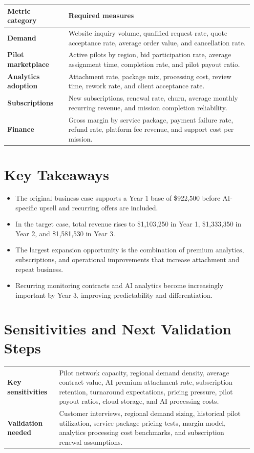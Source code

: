 \documentclass[11pt,a4paper]{article}
\begin{document}
\begin{longtable}{>{\bfseries}p{}p{}}
\toprule
Metric category & Required measures \\
\midrule
Demand & Website inquiry volume, qualified request rate, quote acceptance rate, average order value, and cancellation rate. \\
Pilot marketplace & Active pilots by region, bid participation rate, average assignment time, completion rate, and pilot payout ratio. \\
Analytics adoption & Attachment rate, package mix, processing cost, review time, rework rate, and client acceptance rate. \\
Subscriptions & New subscriptions, renewal rate, churn, average monthly recurring revenue, and mission completion reliability. \\
Finance & Gross margin by service package, payment failure rate, refund rate, platform fee revenue, and support cost per mission. \\
\bottomrule
\end{longtable}

\section{Key Takeaways}

\begin{itemize}[leftmargin=*]
    \item The original business case supports a Year 1 base of \$922,500 before AI-specific upsell and recurring offers are included.
    \item In the target case, total revenue rises to \$1,103,250 in Year 1, \$1,333,350 in Year 2, and \$1,581,530 in Year 3.
    \item The largest expansion opportunity is the combination of premium analytics, subscriptions, and operational improvements that increase attachment and repeat business.
    \item Recurring monitoring contracts and AI analytics become increasingly important by Year 3, improving predictability and differentiation.
\end{itemize}

\section{Sensitivities and Next Validation Steps}

\begin{longtable}{>{\bfseries}p{}p{}}
\toprule
Key sensitivities & Pilot network capacity, regional demand density, average contract value, AI premium attachment rate, subscription retention, turnaround expectations, pricing pressure, pilot payout ratios, cloud storage, and AI processing costs. \\
Validation needed & Customer interviews, regional demand sizing, historical pilot utilization, service package pricing tests, margin model, analytics processing cost benchmarks, and subscription renewal assumptions. \\
\bottomrule
\end{longtable}
\end{document}
